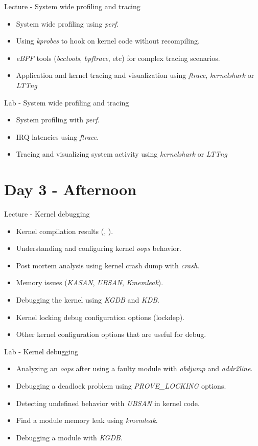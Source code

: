 \documentclass[a4paper,12pt,obeyspaces,spaces,hyphens]{article}
\begin{document}
\feagendatwocolumn
{Lecture - System wide profiling and tracing}
{
  \begin{itemize}
  \item System wide profiling using {\em perf}.
  \item Using {\em kprobes} to hook on kernel code without
    recompiling.
  \item {\em eBPF} tools ({\em bcctools}, {\em bpftrace}, etc) for
    complex tracing scenarios.
  \item Application and kernel tracing and visualization using {\em
      ftrace}, {\em kernelshark} or {\em LTTng}
  \end{itemize}
}
{Lab - System wide profiling and tracing}
{
  \begin{itemize}
  \item System profiling with {\em perf}.
  \item IRQ latencies using {\em ftrace}.
  \item Tracing and visualizing system activity using {\em
      kernelshark} or {\em LTTng}
  \end{itemize}
}

\section{Day 3 - Afternoon}

\feagendatwocolumn
{Lecture - Kernel debugging}
{
  \begin{itemize}
  \item Kernel compilation results (, ).
  \item Understanding and configuring kernel {\em oops} behavior.
  \item Post mortem analysis using kernel crash dump with {\em crash}.
  \item Memory issues ({\em KASAN}, {\em UBSAN}, {\em Kmemleak}).
  \item Debugging the kernel using {\em KGDB} and {\em KDB}.
  \item Kernel locking debug configuration options (lockdep).
  \item Other kernel configuration options that are useful for debug.
  \end{itemize}
}
{Lab - Kernel debugging}
{
  \begin{itemize}
  \item Analyzing an {\em oops} after using a faulty module with
    {\em obdjump} and {\em addr2line}.
  \item Debugging a deadlock problem using {\em PROVE\_LOCKING} options.
  \item Detecting undefined behavior with {\em UBSAN} in kernel code.
  \item Find a module memory leak using {\em kmemleak}.
  \item Debugging a module with {\em KGDB}.
  \end{itemize}
}
\end{document}
